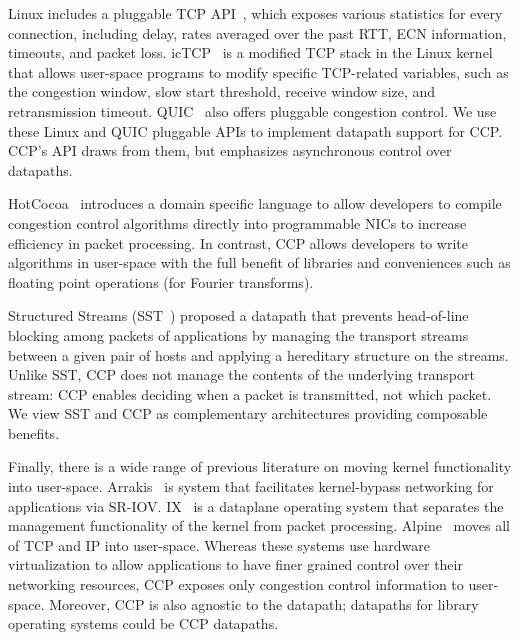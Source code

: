 Linux includes a pluggable TCP API~\cite{lwn-pluggable-tcp}, which exposes various statistics for every connection, including delay, rates averaged over the past RTT, ECN information, timeouts, and packet loss.
icTCP~\cite{icTCP} is a modified TCP stack in the Linux kernel that allows user-space programs to modify specific TCP-related variables, such as the congestion window, slow start threshold, receive window size, and retransmission timeout. 
QUIC~\cite{quic} also offers pluggable congestion control. 
We use these Linux and QUIC pluggable APIs to implement datapath support for CCP. CCP's API draws from them, but emphasizes asynchronous control over datapaths.

HotCocoa~\cite{hotcocoa} introduces a domain specific language to allow developers to compile congestion control algorithms directly into programmable NICs to increase efficiency in packet processing. In contrast, CCP allows developers to write algorithms in user-space with the full benefit of libraries and conveniences such as  floating point operations (\eg for Fourier transforms). 

Structured Streams (SST~\cite{structuredstreams}) proposed a datapath that prevents head-of-line blocking among packets of applications by managing the transport streams between a given pair of hosts and applying a hereditary structure on the streams. %
Unlike SST, CCP does not manage the contents of the underlying transport stream: CCP enables deciding when a packet is transmitted, not which packet.
%
We view SST and CCP as complementary architectures providing composable benefits.
%

Finally, there is a wide range of previous literature on moving kernel functionality into user-space. 
Arrakis~\cite{arrakis2014} is system that facilitates kernel-bypass networking for applications via SR-IOV. 
IX~\cite{ix} is a dataplane operating system that separates the management functionality of the kernel from packet processing. 
Alpine~\cite{alpine} moves all of TCP and IP into user-space.
Whereas these systems use hardware virtualization to allow applications to have finer grained control over their networking resources,
CCP exposes only congestion control information to user-space. 
Moreover, CCP is also agnostic to the datapath; datapaths for library operating systems could be CCP datapaths.